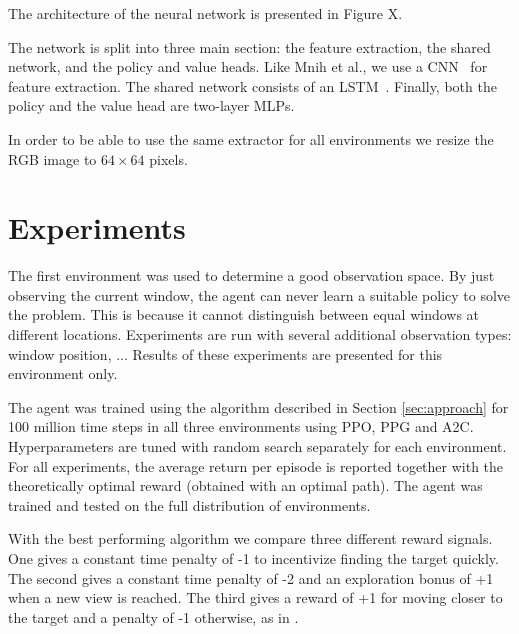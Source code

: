 

The architecture of the neural network is presented in Figure X.

The network is split into three main section: the feature extraction, the shared network, and the policy and value heads.
Like Mnih et al., we use a CNN~\cite{} for feature extraction.
The shared network consists of an LSTM~\cite{hochreiter}.
Finally, both the policy and the value head are two-layer MLPs.

In order to be able to use the same extractor for all environments we resize the RGB image to \(64 \times 64\) pixels.





\section{Experiments}
\label{sec:experiments}

The first environment was used to determine a good observation space.
By just observing the current window, the agent can never learn a suitable policy to solve the problem.
This is because it cannot distinguish between equal windows at different locations.
Experiments are run with several additional observation types: window position, ...
Results of these experiments are presented for this environment only.

The agent was trained using the algorithm described in Section \ref{sec:approach} for 100 million time steps in all three environments using PPO, PPG and A2C.
Hyperparameters are tuned with random search separately for each environment.
For all experiments, the average return per episode is reported together with the theoretically optimal reward (obtained with an optimal path).
The agent was trained and tested on the full distribution of environments.

With the best performing algorithm we compare three different reward signals.
One gives a constant time penalty of -1 to incentivize finding the target quickly.
The second gives a constant time penalty of -2 and an exploration bonus of +1 when a new view is reached.
The third gives a reward of +1 for moving closer to the target and a penalty of -1 otherwise, as in \cite{caicedo_active_2015}.

